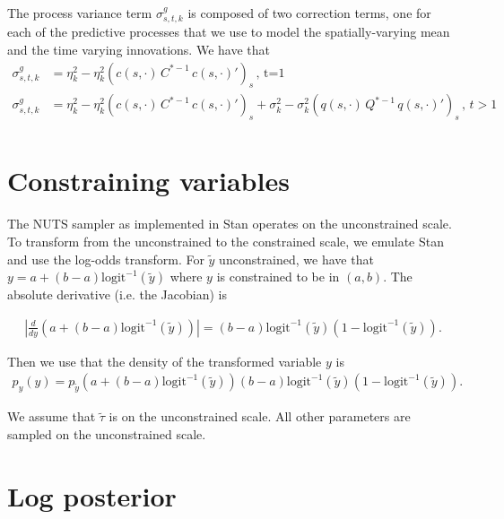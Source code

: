 \documentclass[12pt]{article}
\begin{document}
The process variance term $\sigma^g_{s,t,k}$ is composed of two
correction terms, one for each of the predictive processes that we use
to model the spatially-varying mean and the time varying
innovations. We have that
\begin{align*}
\sigma^g_{s,t,k} &= \eta_k^2 - \eta_k^2 (c(s, \cdot) \, C^{*-1} \, c(s, \cdot)')_{s} \, , \, \text{t=1} \\
\sigma^g_{s,t,k} &= \eta_k^2 - \eta_k^2 (c(s, \cdot) \, C^{*-1} \, c(s, \cdot)')_{s} + \sigma_k^2 - \sigma_k^2(q(s, \cdot) \,  Q^{*-1} \, q(s, \cdot)')_{s} \, , \, t > 1 \\
\end{align*}



\section{Constraining variables}

The NUTS sampler as implemented in Stan operates on the unconstrained
scale. To transform from the unconstrained to the constrained scale, we
emulate Stan and use the log-odds transform. For $\tilde{y}$ unconstrained,
we have that $y = a + (b-a)
\text{logit}^{-1}(\tilde{y})$ where $y$ is constrained to be in
$(a,b)$. The absolute derivative (i.e. the Jacobian) is


\begin{align*}
  \left| \frac{d}{dy}\left(a + (b-a) \text{logit}^{-1}(\tilde{y})\right)
  \right| = (b-a) \text{logit}^{-1}(\tilde{y}) \left( 1 -
  \text{logit}^{-1}(\tilde{y}) \right).
\end{align*}

Then we use that the density of the transformed variable $y$ is
\begin{align*}
p_y(y) = p_{\tilde{y}}(a + (b-a) \text{logit}^{-1}(\tilde{y})) (b-a)
\text{logit}^{-1}(\tilde{y}) \left( 1 -
  \text{logit}^{-1}(\tilde{y}) \right).
\end{align*}

We assume that $\tilde{\tau}$ is on the unconstrained scale. All other parameters are sampled on the unconstrained scale.

\section{Log posterior}
\end{document}
